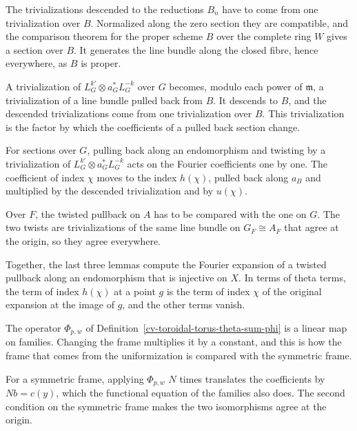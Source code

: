 The trivializations descended to the reductions $B_n$ have to come from one trivialization over $B$. Normalized
along the zero section they are compatible, and the comparison theorem for the proper scheme $B$ over the complete
ring $W$ gives a section over $B$. It generates the line bundle along the closed fibre, hence everywhere, as $B$ is
proper.

A trivialization of $L_G^{k'}\otimes a_G^*L_G^{-k}$ over $G$ becomes, modulo each power of $\mathfrak m$, a
trivialization of a line bundle pulled back from $B$. It descends to $B$, and the descended trivializations come
from one trivialization over $B$. This trivialization is the factor by which the coefficients of a pulled back
section change.

For sections over $G$, pulling back along an endomorphism and twisting by a trivialization of
$L_G^{k'}\otimes a_G^*L_G^{-k}$ acts on the Fourier coefficients one by one. The coefficient of index $\chi$ moves to
the index $h(\chi)$, pulled back along $a_B$ and multiplied by the descended trivialization and by $u(\chi)$.

Over $F$, the twisted pullback on $A$ has to be compared with the one on $G$. The two twists are trivializations
of the same line bundle on $G_F\cong A_F$ that agree at the origin, so they agree everywhere.

Together, the last three lemmas compute the Fourier expansion of a twisted pullback along an endomorphism that is
injective on $X$. In terms of theta terms, the term of index $h(\chi)$ at a point $g$ is the term of index $\chi$
of the original expansion at the image of $g$, and the other terms vanish.

The operator $\Phi_{p,w}$ of Definition~\ref{cv-toroidal-torus-theta-sum-phi} is a linear map on families.
Changing the frame multiplies it by a constant, and this is how the frame that comes from the uniformization is
compared with the symmetric frame.

For a symmetric frame, applying $\Phi_{p,w}$ $N$ times translates the coefficients by $Nb=c(y)$, which the
functional equation of the families also does. The second condition on the symmetric frame makes the two
isomorphisms agree at the origin.

